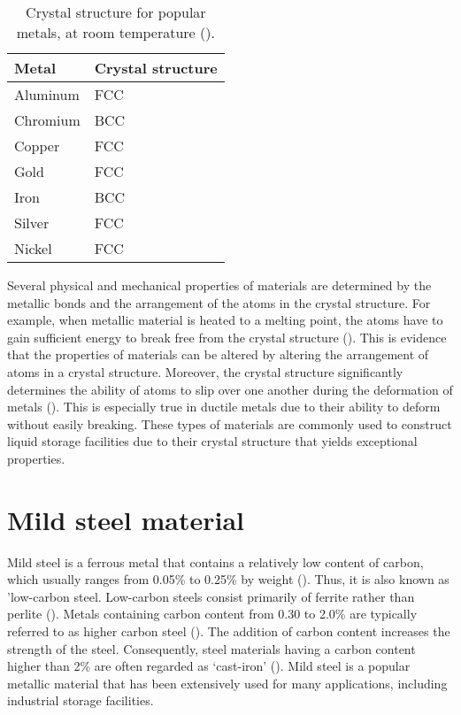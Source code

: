 \begin{table}[H]
\caption{Crystal structure for popular metals, at room temperature (\cite{hench2005biomaterials}).}

\begin{tabularx}{.8\textwidth}{ XX }
    \hline
    Metal & Crystal structure \\
    \hline
    Aluminum & FCC \\
    Chromium & BCC \\
    Copper & FCC \\
    Gold & FCC \\
    Iron & BCC \\
    Silver & FCC \\
    Nickel & FCC \\
    \hline
\end{tabularx}

\label{ch3:table:structure}
\end{table}

Several physical and mechanical properties of materials are determined by the metallic bonds and the arrangement of the atoms in the crystal structure. For example, when metallic material is heated to a melting point, the atoms have to gain sufficient energy to break free from the crystal structure (\cite{hench2005biomaterials}). This is evidence that the properties of materials can be altered by altering the arrangement of atoms in a crystal structure. Moreover, the crystal structure significantly determines the ability of atoms to slip over one another during the deformation of metals (\cite{callister2018materials}). This is especially true in ductile metals due to their ability to deform without easily breaking. These types of materials are commonly used to construct liquid storage facilities due to their crystal structure that yields exceptional properties.

\section{Mild steel material}
\label{ch3:anchor:section:material}
Mild steel is a ferrous metal that contains a relatively low content of carbon, which usually ranges from 0.05\% to 0.25\% by weight (\cite{callister2018materials}). Thus, it is also known as 'low-carbon steel.  Low-carbon steels consist primarily of ferrite rather than perlite (\cite{li2018effect}). Metals containing carbon content from 0.30 to 2.0\% are typically referred to as higher carbon steel (\cite{timings2008fabrication}). The addition of carbon content increases the strength of the steel. Consequently, steel materials having a carbon content higher than 2\% are often regarded as ‘cast-iron' (\cite{callister2018materials}).  Mild steel is a popular metallic material that has been extensively used for many applications, including industrial storage facilities.

